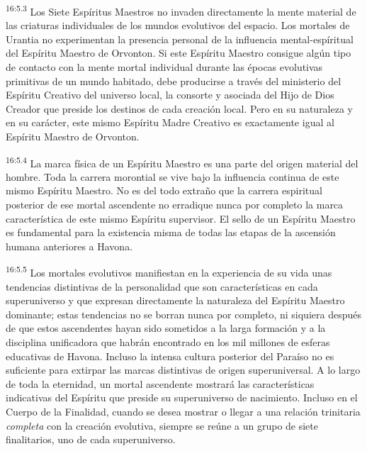 \par
\textsuperscript{16:5.3} Los Siete Espíritus Maestros no invaden directamente la mente material de las criaturas individuales de los mundos evolutivos del espacio. Los mortales de Urantia no experimentan la presencia personal de la influencia mental-espíritual del Espíritu Maestro de Orvonton. Si este Espíritu Maestro consigue algún tipo de contacto con la mente mortal individual durante las épocas evolutivas primitivas de un mundo habitado, debe producirse a través del ministerio del Espíritu Creativo del universo local, la consorte y asociada del Hijo de Dios Creador que preside los destinos de cada creación local. Pero en su naturaleza y en su carácter, este mismo Espíritu Madre Creativo es exactamente igual al Espíritu Maestro de Orvonton.

\par
\textsuperscript{16:5.4} La marca física de un Espíritu Maestro es una parte del origen material del hombre. Toda la carrera morontial se vive bajo la influencia continua de este mismo Espíritu Maestro. No es del todo extraño que la carrera espiritual posterior de ese mortal ascendente no erradique nunca por completo la marca característica de este mismo Espíritu supervisor. El sello de un Espíritu Maestro es fundamental para la existencia misma de todas las etapas de la ascensión humana anteriores a Havona.

\par
\textsuperscript{16:5.5} Los mortales evolutivos manifiestan en la experiencia de su vida unas tendencias distintivas de la personalidad que son características en cada superuniverso y que expresan directamente la naturaleza del Espíritu Maestro dominante; estas tendencias no se borran nunca por completo, ni siquiera después de que estos ascendentes hayan sido sometidos a la larga formación y a la disciplina unificadora que habrán encontrado en los mil millones de esferas educativas de Havona. Incluso la intensa cultura posterior del Paraíso no es suficiente para extirpar las marcas distintivas de origen superuniversal. A lo largo de toda la eternidad, un mortal ascendente mostrará las características indicativas del Espíritu que preside su superuniverso de nacimiento. Incluso en el Cuerpo de la Finalidad, cuando se desea mostrar o llegar a una relación trinitaria \textit{completa} con la creación evolutiva, siempre se reúne a un grupo de siete finalitarios, uno de cada superuniverso.

